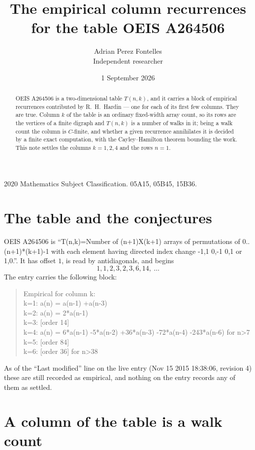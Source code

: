 \documentclass[11pt,a4paper]{article}
\title{The empirical column recurrences for the table OEIS A264506}
\author{Adrian Perez Fontelles\\ \small Independent researcher}
\date{1 September 2026}
\theoremstyle{plain}
\theoremstyle{definition}
\begin{document}
\maketitle

\begin{abstract}
OEIS A264506 is a two-dimensional table $T(n,k)$, and it carries a block of empirical
recurrences contributed by R.~H.~Hardin --- one for each of its first few columns. They are
true. Column $k$ of the table is an ordinary fixed-width array count, so its rows are the
vertices of a finite digraph and $T(n,k)$ is a number of walks in it; being a walk count the
column is $C$-finite, and whether a given recurrence annihilates it is decided by a finite
exact computation, with the Cayley--Hamilton theorem bounding the work. This note settles the columns $k=1, 2, 4$ and the rows $n=1$.
\end{abstract}

\noindent\small 2020 Mathematics Subject Classification. 05A15, 05B45, 15B36.\normalsize

\section{The table and the conjectures}

OEIS A264506 is ``T(n,k)=Number of (n+1)X(k+1) arrays of permutations of 0..(n+1)*(k+1)-1 with each element having directed index change -1,1 0,-1 0,1 or 1,0.''. It has offset $1$, is
read by antidiagonals, and begins
\[
1, 1, 2, 3, 2, 3, 6, 14,\ \dots
\]
The entry carries the following block:
\begin{quote}\small
Empirical for column k:\\
k=1: a(n) = a(n-1) +a(n-3)\\
k=2: a(n) = 2*a(n-1)\\
k=3: [order 14]\\
k=4: a(n) = 6*a(n-1) -5*a(n-2) +36*a(n-3) -72*a(n-4) -243*a(n-6) for n>7\\
k=5: [order 84]\\
k=6: [order 36] for n>38\\
\end{quote}
As of the ``Last modified'' line on the live entry (Nov 15 2015 18:38:06, revision 4) these are still
recorded as empirical, and nothing on the entry records any of them as settled.

\section{A column of the table is a walk count}
\end{document}
